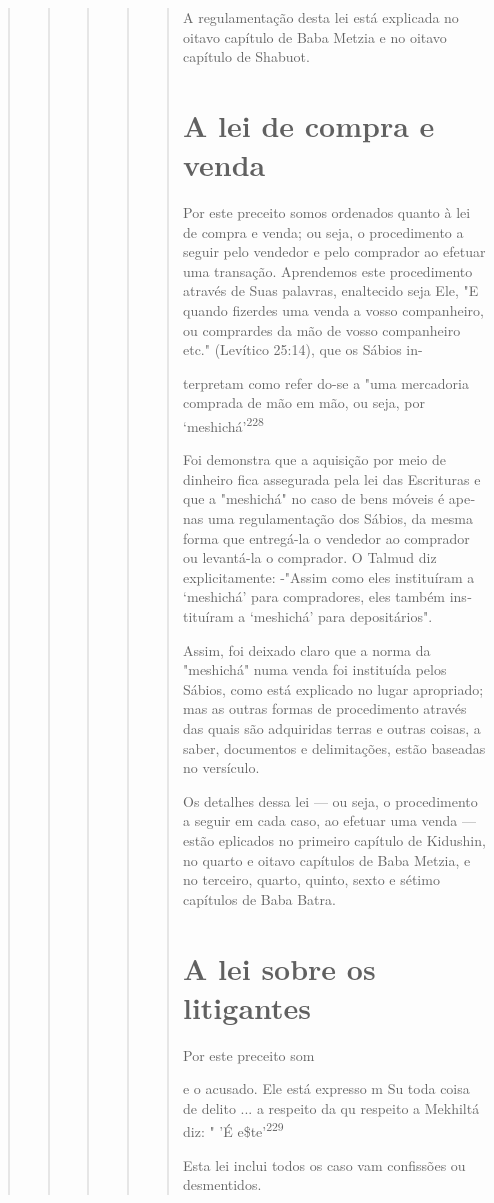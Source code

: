 \begin{quote}
\begin{quote}
\begin{quote}
\begin{quote}
\begin{quote}
A regulamentação desta lei está explicada no oitavo capítulo de Ba­ba
Metzia e no oitavo capítulo de Shabuot.

\section{A lei de compra e venda}

Por este preceito somos ordenados quanto à lei de compra e venda; ou
seja, o procedimento a seguir pelo vendedor e pelo comprador ao efetuar
uma transação. Aprendemos este procedimento através de Suas palavras,
enal­tecido seja Ele, "E quando fizerdes uma venda a vosso companheiro,
ou com­prardes da mão de vosso companheiro etc." (Levítico 25:14), que
os Sábios in-



terpretam como refer do-se a "uma mercadoria comprada de mão em mão, ou
seja, por `meshichá'\textsuperscript{228}

Foi demonstra que a aquisição por meio de dinheiro fica assegu­rada pela
lei das Escrituras e que a "meshichá" no caso de bens móveis é ape­nas
uma regulamentação dos Sábios, da mesma forma que entregá-la o vende­dor
ao comprador ou levantá-la o comprador. O Talmud diz explicitamente:
-"Assim como eles instituíram a `meshichá' para compradores, eles também
ins­tituíram a `meshichá' para depositários".

Assim, foi deixado claro que a norma da "meshichá" numa venda foi
instituída pelos Sábios, como está explicado no lugar apropriado; mas as
outras formas de procedimento através das quais são adquiridas terras e
outras coisas, a saber, documentos e delimitações, estão baseadas no
versículo.

Os detalhes dessa lei --- ou seja, o procedimento a seguir em cada caso,
ao efetuar uma venda --- estão eplicados no primeiro capítulo de
Kidus­hin, no quarto e oitavo capítulos de Baba Metzia, e no terceiro,
quarto, quinto, sexto e sétimo capítulos de Baba Batra.

\section{A lei sobre os litigantes}

Por este preceito som

e o acusado. Ele está expresso m Su toda coisa de delito ... a respeito
da qu respeito a Mekhiltá diz: " 'É e\$te'\textsuperscript{229}

Esta lei inclui todos os caso vam confissões ou desmentidos.


\end{quote}
\end{quote}
\end{quote}
\end{quote}
\end{quote}
